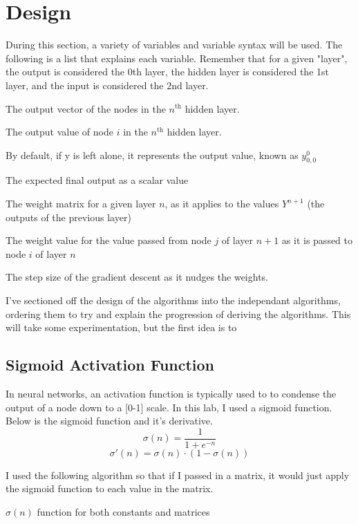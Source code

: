 \documentclass[10pt]{article}
\begin{document}
\section{Design}
During this section, a variety of variables and variable syntax will be used. The following is a list that explains each variable. Remember that for a given "layer", the output is considered the 0th layer, the hidden layer is considered the 1st layer, and the input is considered the 2nd layer.
\begin{description}[style=nextline]
    \item[$y^n$] The output vector of the nodes in the $n^{\text{th}}$ hidden layer. 
    \item[$y^n_{i,0}$] The output value of node $i$ in the $n^{\text{th}}$ hidden layer.
    \item[$y$] By default, if y is left alone, it represents the output value, known as $y^0_{0,0}$ 
    \item[$\hat{y}$] The expected final output as a scalar value
    \item[$W^n$] The weight matrix for a given layer $n$, as it applies to the values $Y^{n+1}$ (the outputs of the previous layer) 
    \item[$w^n_{i,j}$] The weight value for the value passed from node $j$ of layer $n+1$ as it is passed to node $i$ of layer $n$
    \item[$\eta$] The step size of the gradient descent as it nudges the weights. 
\end{description}

I've sectioned off the design of the algorithms into the independant algorithms, ordering them to try and explain the progression of deriving the algorithms. 
This will take some experimentation, but the first idea is to 
\subsection{Sigmoid Activation Function}
In neural networks, an activation function is typically used to to condense the output of a node down to a [0-1] scale. In this lab, I used a sigmoid function. Below is the sigmoid function and it's derivative.
$$\sigma(n) = \frac{1}{1 + e^{-n}}$$
$$\sigma'(n) = \sigma(n) \cdot (1 - \sigma(n))$$

I used the following algorithm so that if I passed in a matrix, it would just apply the sigmoid function to each value in the matrix.

\begin{algorithm}[H]
    \caption{$\sigma(n)$ function for both constants and matrices}
\end{algorithm}
\end{document}
